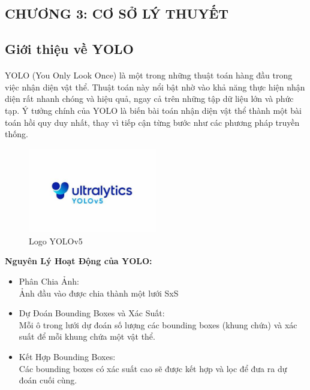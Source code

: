 \begin{flushleft}
    \fontsize{16}{20}\selectfont
    \section*{CHƯƠNG 3: CƠ SỞ LÝ THUYẾT}
    \fontsize{13}{20}\selectfont
    \setcounter{section}{3}
    \setcounter{subsection}{0}
    \subsection{Giới thiệu về YOLO}
    \fontsize{13}{20}\selectfont\paragraph{}
    YOLO (You Only Look Once) là một trong những thuật toán hàng đầu trong việc nhận diện vật thể. Thuật toán này nổi bật nhờ vào khả năng thực hiện nhận diện rất nhanh chóng và hiệu quả, ngay cả trên những tập dữ liệu lớn và phức tạp. Ý tưởng chính của YOLO là biến bài toán nhận diện vật thể thành một bài toán hồi quy duy nhất, thay vì tiếp cận từng bước như các phương pháp truyền thống.\\
    \begin{figure}[h]
        \centering
        \includegraphics[width=0.5\textwidth]{images/logoYOLO.jpg}
        \caption{Logo YOLOv5}
        \label{fig:logo_YOLO}
    \end{figure}
    \textbf{Nguyên Lý Hoạt Động của YOLO:}\\
    \begin{itemize}
            \item Phân Chia Ảnh: \\Ảnh đầu vào được chia thành một lưới SxS
            \item Dự Đoán Bounding Boxes và Xác Suất:\\Mỗi ô trong lưới dự đoán số lượng các bounding boxes (khung chứa) và xác suất để mỗi khung chứa một vật thể.
            \item Kết Hợp Bounding Boxes: \\Các bounding boxes có xác suất cao sẽ được kết hợp và lọc để đưa ra dự đoán cuối cùng.

\end{itemize}
\end{flushleft}
